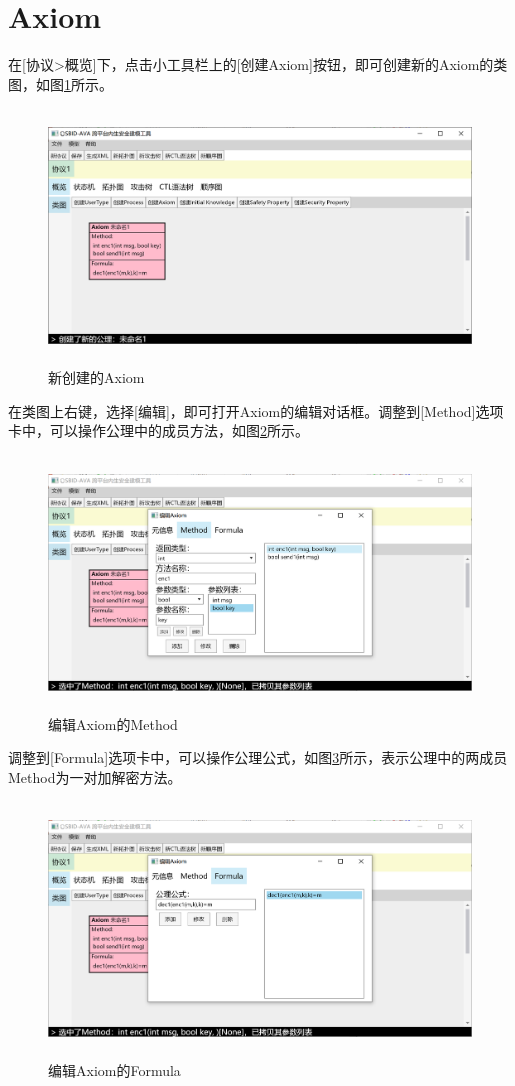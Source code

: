 \section{Axiom}
在[协议>概览]下，点击小工具栏上的[创建Axiom]按钮，即可创建新的Axiom的类图，如图\ref{create_axiom}所示。
\begin{figure}[h]
	\centering
	\includegraphics[width=12cm,height=6.75cm]{imgs/create_axiom.png}
	\caption{新创建的Axiom}
	\label{create_axiom}
\end{figure}
\par
在类图上右键，选择[编辑]，即可打开Axiom的编辑对话框。调整到[Method]选项卡中，可以操作公理中的成员方法，如图\ref{edit_axiom_method}所示。
\begin{figure}[h]
	\centering
	\includegraphics[width=12cm,height=6.75cm]{imgs/edit_axiom_method.png}
	\caption{编辑Axiom的Method}
	\label{edit_axiom_method}
\end{figure}
\par
调整到[Formula]选项卡中，可以操作公理公式，如图\ref{edit_axiom_formula}所示，表示公理中的两成员Method为一对加解密方法。
\begin{figure}[h]
	\centering
	\includegraphics[width=12cm,height=6.75cm]{imgs/edit_axiom_formula.png}
	\caption{编辑Axiom的Formula}
	\label{edit_axiom_formula}
\end{figure}
